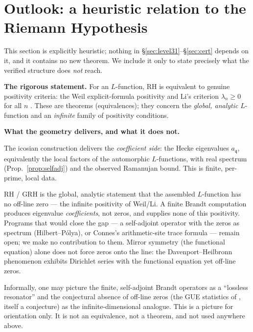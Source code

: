 \documentclass[11pt,a4paper]{article}
\newcommand{\fq}{\mathfrak{q}}
\begin{document}
\section{Outlook: a heuristic relation to the Riemann Hypothesis}\label{sec:rh}

This section is explicitly heuristic; nothing in
\S\ref{sec:level31}--\S\ref{sec:cert} depends on it, and it contains no
new theorem. We include it only to state precisely what the verified
structure does \emph{not} reach.

\medskip\noindent\textbf{The rigorous statement.}
For an $L$-function, RH is equivalent to genuine positivity criteria:
the Weil explicit-formula positivity \cite{Weil1952} and Li's criterion
$\lambda_n\ge0$ for all $n$ \cite{Li1997,BombieriLagarias1999}. These
are theorems (equivalences); they concern the \emph{global, analytic}
$L$-function and an \emph{infinite} family of positivity conditions.

\medskip\noindent\textbf{What the geometry delivers, and what it does not.}
\begin{verifiedbox}
The icosian construction delivers the \emph{coefficient side}: the Hecke
eigenvalues $a_\fq$, equivalently the local factors of the automorphic
$L$-functions, with real spectrum (Prop.~\ref{prop:selfadj}) and the
observed Ramanujan bound. This is finite, per-prime, local data.
\end{verifiedbox}

\begin{opengapbox}
RH / GRH is the global, analytic statement that the assembled
$L$-function has no off-line zero --- the infinite positivity of
Weil/Li. A finite Brandt computation produces eigenvalue
\emph{coefficients}, not zeros, and supplies none of this positivity.
Programs that would close the gap --- a self-adjoint operator with the
zeros as spectrum (Hilbert--P\'olya), or Connes's arithmetic-site trace
formula \cite{Connes1999} --- remain open; we make no contribution to
them. Mirror symmetry (the functional equation) alone does not force
zeros onto the line: the Davenport--Heilbronn phenomenon
\cite{Davenport1936} exhibits Dirichlet series with the functional
equation yet off-line zeros.
\end{opengapbox}

\begin{interpretbox}
Informally, one may picture the finite, self-adjoint Brandt operators as
a ``lossless resonator'' and the conjectural absence of off-line zeros
(the GUE statistics of \cite{Montgomery1973,BerryKeating1999}, itself a
conjecture) as the infinite-dimensional analogue. This is a picture for
orientation only. It is not an equivalence, not a theorem, and not used
anywhere above.
\end{interpretbox}
\end{document}
